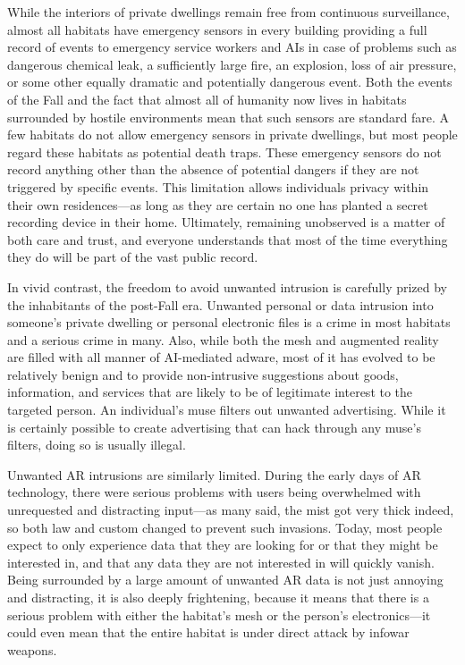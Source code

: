 While the interiors of private dwellings remain free from continuous
surveillance, almost all habitats have emergency sensors in every
building providing a full record of events to emergency service
workers and AIs in case of problems such as dangerous chemical leak, a
sufficiently large fire, an explosion, loss of air pressure, or some
other equally dramatic and potentially dangerous event. Both the
events of the Fall and the fact that almost all of humanity now lives
in habitats surrounded by hostile environments mean that such sensors
are standard fare. A few habitats do not allow emergency sensors in
private dwellings, but most people regard these habitats as potential
death traps.  These emergency sensors do not record anything other
than the absence of potential dangers if they are not triggered by
specific events. This limitation allows individuals privacy within
their own residences—as long as they are certain no one has planted a
secret recording device in their home. Ultimately, remaining
unobserved is a matter of both care and trust, and everyone
understands that most of the time everything they do will be part of
the vast public record.

In vivid contrast, the freedom to avoid unwanted intrusion is
carefully prized by the inhabitants of the post-Fall era. Unwanted
personal or data intrusion into someone's private dwelling or personal
electronic files is a crime in most habitats and a serious crime in
many. Also, while both the mesh and augmented reality are filled with
all manner of AI-mediated adware, most of it has evolved to be
relatively benign and to provide non-intrusive suggestions about
goods, information, and services that are likely to be of legitimate
interest to the targeted person. An individual's muse filters out
unwanted advertising. While it is certainly possible to create
advertising that can hack through any muse's filters, doing so is
usually illegal.

Unwanted AR intrusions are similarly limited.  During the early days
of AR technology, there were serious problems with users being
overwhelmed with unrequested and distracting input—as many said, the
mist got very thick indeed, so both law and custom changed to prevent
such invasions. Today, most people expect to only experience data that
they are looking for or that they might be interested in, and that any
data they are not interested in will quickly vanish. Being surrounded
by a large amount of unwanted AR data is not just annoying and
distracting, it is also deeply frightening, because it means that
there is a serious problem with either the habitat's mesh or the
person's electronics—it could even mean that the entire habitat is
under direct attack by infowar weapons.

